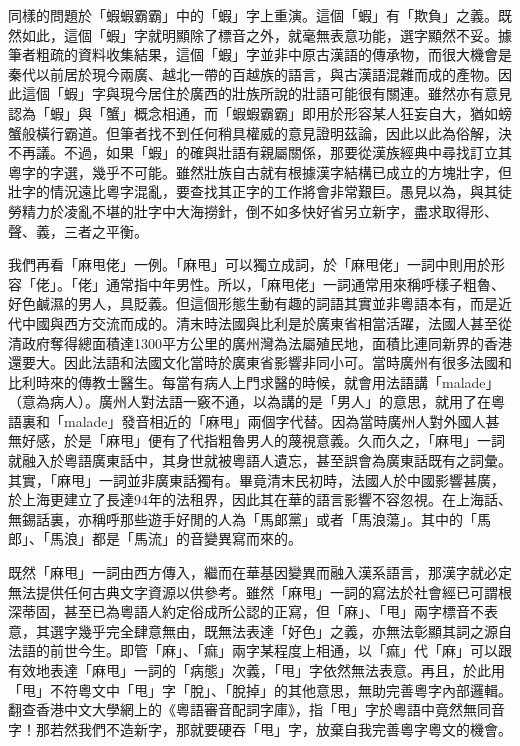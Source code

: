 \documentclass[a5paper, 10pt, openany]{book} %
\begin{document}
同樣的問題於「蝦蝦霸霸」中的「蝦」字上重演。這個「蝦」有「欺負」之義。既然如此，這個「蝦」字就明顯除了標音之外，就毫無表意功能，選字顯然不妥。據筆者粗疏的資料收集結果，這個「蝦」字並非中原古漢語的傳承物，而很大機會是秦代以前居於現今兩廣、越北一帶的百越族的語言，與古漢語混雜而成的產物。因此這個「蝦」字與現今居住於廣西的壯族所說的壯語可能很有關連。雖然亦有意見認為「蝦」與「蟹」概念相通，而「蝦蝦霸霸」即用於形容某人狂妄自大，猶如螃蟹般橫行霸道。但筆者找不到任何稍具權威的意見證明茲論，因此以此為俗解，決不再議。不過，如果「蝦」的確與壯語有親屬關係，那要從漢族經典中尋找訂立其粵字的字選，幾乎不可能。雖然壯族自古就有根據漢字結構已成立的方塊壯字，但壯字的情況遠比粵字混亂，要查找其正字的工作將會非常艱巨。愚見以為，與其徒勞精力於凌亂不堪的壯字中大海撈針，倒不如多快好省另立新字，盡求取得形、聲、義，三者之平衡。

我們再看「麻甩佬」一例。「麻甩」可以獨立成詞，於「麻甩佬」一詞中則用於形容「佬」。「佬」通常指中年男性。所以，「麻甩佬」一詞通常用來稱呼樣子粗魯、好色鹹濕的男人，具貶義。但這個形態生動有趣的詞語其實並非粵語本有，而是近代中國與西方交流而成的。清末時法國與比利是於廣東省相當活躍，法國人甚至從清政府奪得總面積達1300平方公里的廣州灣為法屬殖民地，面積比連同新界的香港還要大。因此法語和法國文化當時於廣東省影響非同小可。當時廣州有很多法國和比利時來的傳教士醫生。每當有病人上門求醫的時候，就會用法語講「malade」（意為病人）。廣州人對法語一竅不通，以為講的是「男人」的意思，就用了在粵語裏和「malade」發音相近的「麻甩」兩個字代替。因為當時廣州人對外國人甚無好感，於是「麻甩」便有了代指粗魯男人的蔑視意義。久而久之，「麻甩」一詞就融入於粵語廣東話中，其身世就被粵語人遺忘，甚至誤會為廣東話既有之詞彙。其實，「麻甩」一詞並非廣東話獨有。畢竟清末民初時，法國人於中國影響甚廣，於上海更建立了長達94年的法租界，因此其在華的語言影響不容忽視。在上海話、無錫話裏，亦稱呼那些遊手好閒的人為「馬郞黨」或者「馬浪蕩」。其中的「馬郎」、「馬浪」都是「馬流」的音變異寫而來的。

既然「麻甩」一詞由西方傳入，繼而在華基因變異而融入漢系語言，那漢字就必定無法提供任何古典文字資源以供參考。雖然「麻甩」一詞的寫法於社會經已可謂根深蒂固，甚至已為粵語人約定俗成所公認的正寫，但「麻」、「甩」兩字標音不表意，其選字幾乎完全肆意無由，既無法表達「好色」之義，亦無法彰顯其詞之源自法語的前世今生。即管「麻」、「痲」兩字某程度上相通，以「痲」代「麻」可以跟有效地表達「麻甩」一詞的「病態」次義，「甩」字依然無法表意。再且，於此用「甩」不符粵文中「甩」字「脫」、「脫掉」的其他意思，無助完善粵字內部邏輯。翻查香港中文大學網上的《粵語審音配詞字庫》，指「甩」字於粵語中竟然無同音字！那若然我們不造新字，那就要硬吞「甩」字，放棄自我完善粵字粵文的機會。
\end{document}
